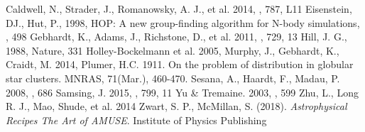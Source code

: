\documentclass{aastex62}
\begin{document}
\begin{thebibliography}{}
Caldwell, N., Strader, J., Romanowsky, A. J., et al. 2014, \apjl, 787, L11
Eisenstein, DJ., Hut, P., 1998, HOP: A new group-finding algorithm for N-body simulations, \apj, 498
Gebhardt, K., Adams, J., Richstone, D., et al. 2011, \apj, 729, 13
Hill, J. G., 1988, Nature, 331
Holley-Bockelmann et al. 2005, \apjl
{}
Murphy, J., Gebhardt, K., Craidt, M. 2014, \apj
{}
Plumer, H.C. 1911. On the problem of distribution in globular star clusters. MNRAS, 71(Mar.), 460-470.
Sesana, A., Haardt, F., Madau, P. 2008, \apj, 686
Samsing, J. 2015, \apj, 799, 11
Yu \& Tremaine. 2003, \apj, 599
Zhu, L., Long R. J., Mao, Shude, et al. 2014 \apj
{}
Zwart, S. P., McMillan, S. (2018). \textit{Astrophysical Recipes The Art of AMUSE}. Institute of Physics Publishing
\end{thebibliography}
\end{document}
